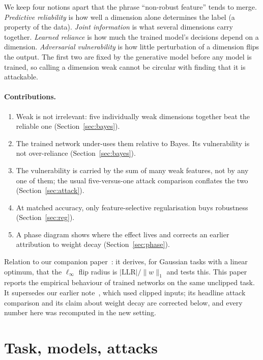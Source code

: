 \documentclass[11pt]{article}
\newcommand{\linf}{\ell_\infty}
\begin{document}
We keep four notions apart that the phrase ``non-robust feature'' tends to
merge. \emph{Predictive reliability} is how well a dimension alone determines
the label (a property of the data). \emph{Joint information} is what several
dimensions carry together. \emph{Learned reliance} is how much the trained
model's decisions depend on a dimension. \emph{Adversarial vulnerability} is how
little perturbation of a dimension flips the output. The first two are fixed by
the generative model before any model is trained, so calling a dimension weak
cannot be circular with finding that it is attackable.

\paragraph{Contributions.}
\begin{enumerate}
\item Weak is not irrelevant: five individually weak dimensions together beat
the reliable one (Section~\ref{sec:bayes}).
\item The trained network under-uses them relative to Bayes. Its vulnerability is
not over-reliance (Section~\ref{sec:bayes}).
\item The vulnerability is carried by the sum of many weak features, not by any one
of them; the usual five-versus-one attack comparison conflates the two
(Section~\ref{sec:attack}).
\item At matched accuracy, only feature-selective regularisation buys robustness
(Section~\ref{sec:reg}).
\item A phase diagram shows where the effect lives and corrects an earlier
attribution to weight decay (Section~\ref{sec:phase}).
\end{enumerate}

Relation to our companion paper~\cite{rootcause}: it derives, for
Gaussian tasks with a linear optimum, that the $\linf$ flip radius is
$|\mathrm{LLR}|/\|w\|_1$ and tests this. This paper reports the empirical
behaviour of trained networks on the same unclipped task. It supersedes our
earlier note~\cite{earlier}, which used clipped inputs; its headline attack
comparison and its claim about weight decay are corrected below, and every
number here was recomputed in the new setting.

\section{Task, models, attacks}
\label{sec:task}
\end{document}
